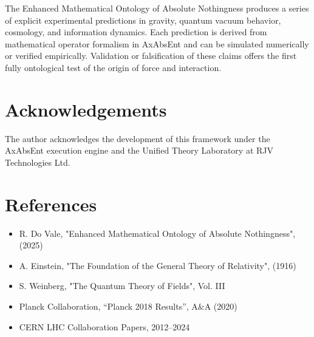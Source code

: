 \documentclass[11pt]{article}
\begin{document}
The Enhanced Mathematical Ontology of Absolute Nothingness produces a series of explicit experimental predictions in gravity, quantum vacuum behavior, cosmology, and information dynamics. Each prediction is derived from mathematical operator formalism in AxAbsEnt and can be simulated numerically or verified empirically. Validation or falsification of these claims offers the first fully ontological test of the origin of force and interaction.

\section*{Acknowledgements}
The author acknowledges the development of this framework under the AxAbsEnt execution engine and the Unified Theory Laboratory at RJV Technologies Ltd.

\section*{References}
\vspace{-1em}
\begin{itemize}
    \item R. Do Vale, "Enhanced Mathematical Ontology of Absolute Nothingness", (2025)
    \item A. Einstein, "The Foundation of the General Theory of Relativity", (1916)
    \item S. Weinberg, "The Quantum Theory of Fields", Vol. III
    \item Planck Collaboration, “Planck 2018 Results”, A\&A (2020)
    \item CERN LHC Collaboration Papers, 2012–2024
\end{itemize}
\end{document}
